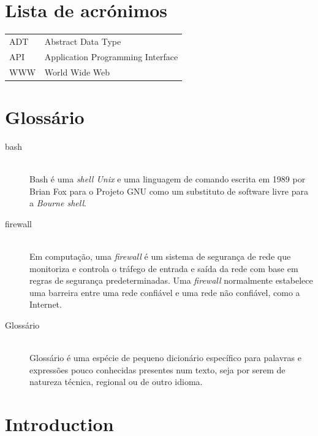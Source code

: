 \documentclass[11pt,a4paper]{report}
\begin{document}
\chapter*{Lista de acrónimos}

\begin{flushleft}
\begin{tabular}{l p{0.8\linewidth}}
ADT      & Abstract Data Type\\
API      & Application Programming Interface\\
WWW      & World Wide Web
\end{tabular}
\end{flushleft}

\chapter*{Glossário}

\begin{description}
\item[bash] \hfill \\
  Bash é uma \emph{shell Unix} e uma linguagem de comando escrita
  em 1989 por Brian Fox para o Projeto GNU como um substituto de
  software livre para a \emph{Bourne shell}.
\item[firewall] \hfill \\
  Em computação, uma \emph{firewall} é um sistema de segurança de rede
  que monitoriza e controla o tráfego de entrada e saída da rede
  com base em regras de segurança predeterminadas.
  Uma \emph{firewall} normalmente estabelece uma barreira entre uma
  rede confiável e uma rede não confiável, como a Internet.
\item[Glossário] \hfill \\
  Glossário é uma espécie de pequeno dicionário específico para
  palavras e expressões pouco conhecidas presentes num texto, seja
  por serem de natureza técnica, regional ou de outro idioma.
\end{description}

\chapter{Introduction}
\pagestyle{fancy}
\setcounter{page}{1}
\end{document}
